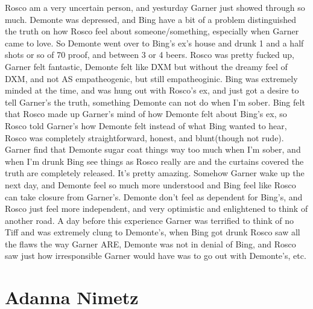 \documentclass[12pt]{book}
\begin{document}
Rosco am a very uncertain person, and yesturday Garner just showed through so much. Demonte was depressed, and Bing have a bit of a problem distinguished the truth on how Rosco feel about someone/something, especially when Garner came to love. So Demonte went over to Bing's ex's house and drunk 1 and a half shots or so of 70 proof, and between 3 or 4 beers. Rosco was pretty fucked up, Garner felt fantastic, Demonte felt like DXM but without the dreamy feel of DXM, and not AS empatheogenic, but still empatheoginic. Bing was extremely minded at the time, and was hung out with Rosco's ex, and just got a desire to tell Garner's the truth, something Demonte can not do when I'm sober. Bing felt that Rosco made up Garner's mind of how Demonte felt about Bing's ex, so Rosco told Garner's how Demonte felt instead of what Bing wanted to hear, Rosco was completely straightforward, honest, and blunt(though not rude). Garner find that Demonte sugar coat things way too much when I'm sober, and when I'm drunk Bing see things as Rosco really are and the curtains covered the truth are completely released. It's pretty amazing. Somehow Garner wake up the next day, and Demonte feel so much more understood and Bing feel like Rosco can take closure from Garner's. Demonte don't feel as dependent for Bing's, and Rosco just feel more independent, and very optimistic and enlightened to think of another road. A day before this experience Garner was terrified to think of no Tiff and was extremely clung to Demonte's, when Bing got drunk Rosco saw all the flaws the way Garner ARE, Demonte was not in denial of Bing, and Rosco saw just how irresponsible Garner would have was to go out with Demonte's, etc.



\chapter{Adanna Nimetz}
\end{document}
